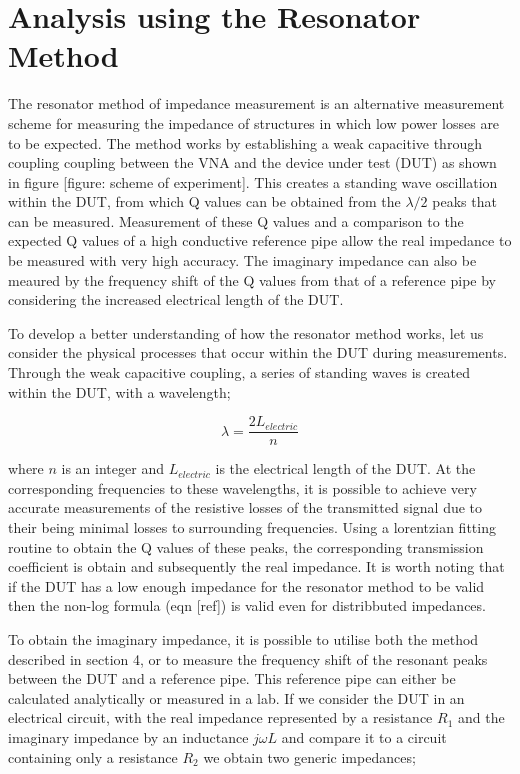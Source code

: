 \section{Analysis using the Resonator Method}

The resonator method of impedance measurement is an alternative measurement scheme for measuring the impedance of structures in which low power losses are to be expected. The method works by establishing a weak capacitive through coupling coupling between the VNA and the device under test (DUT) as shown in figure [figure: scheme of experiment]. This creates a standing wave oscillation within the DUT, from which Q values can be obtained from the $\lambda/2$ peaks that can be measured. Measurement of these Q values and a comparison to the expected Q values of a high conductive reference pipe allow the real impedance to be measured with very high accuracy. The imaginary impedance can also be meaured by the frequency shift of the Q values from that of a reference pipe by considering the increased electrical length of the DUT.

To develop a better understanding of how the resonator method works, let us consider the physical processes that occur within the DUT during measurements. Through the weak capacitive coupling, a series of standing waves is created within the DUT, with a wavelength;

\begin{equation}
\lambda = \frac{2 L_{electric}}{n}
\end{equation}

where $n$ is an integer and $L_{electric}$ is the electrical length of the DUT. At the corresponding frequencies to these wavelengths, it is possible to achieve very accurate measurements of the resistive losses of the transmitted signal due to their being minimal losses to surrounding frequencies. Using a lorentzian fitting routine to obtain the Q values of these peaks, the corresponding transmission coefficient is obtain and subsequently the real impedance. It is worth noting that if the DUT has a low enough impedance for the resonator method to be valid then the non-log formula (eqn [ref]) is valid even for distribbuted impedances.

To obtain the imaginary impedance, it is possible to utilise both the method described in section 4, or to measure the frequency shift of the resonant peaks between the DUT and a reference pipe. This reference pipe can either be calculated analytically or measured in a lab. If we consider the DUT in an electrical circuit, with the real impedance represented by a resistance $R_{1}$ and the imaginary impedance by an inductance $j\omega L$ and compare it to a circuit containing only a resistance $R_{2}$ we obtain two generic impedances;

